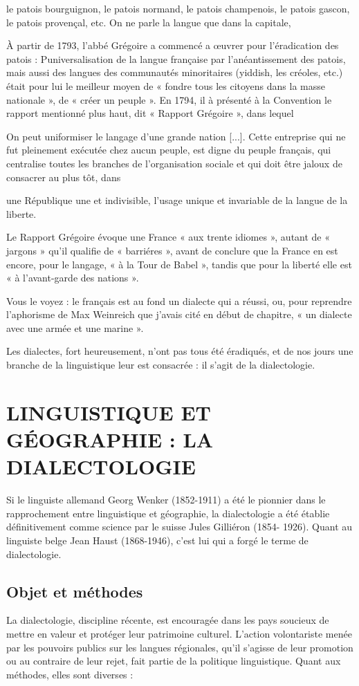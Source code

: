 le patois bourguignon, le patois normand, le patois champenois, le patois gascon, le patois provençal, etc. On ne parle la langue que dans la capitale,


À partir de 1793, l’abbé Grégoire a commencé a œuvrer pour l’éradication des patois : Puniversalisation de la langue française par l’anéantissement des patois, mais aussi des langues des communautés minoritaires (yiddish, les créoles, etc.) était pour lui le meilleur moyen de « fondre tous les citoyens dans la masse nationale », de « créer un peuple ». En 1794, il à présenté à la Convention le rapport mentionné plus haut, dit « Rapport Grégoire », dans lequel



On peut uniformiser le langage d'une grande nation [...]. Cette entreprise qui ne fut pleinement exécutée chez aucun peuple, est digne du peuple français, qui centralise toutes les branches de l’organisation sociale et qui doit être jaloux de consacrer au plus tôt, dans


une République une et indivisible, l’usage unique et invariable de la langue de la liberte.


Le Rapport Grégoire évoque une France « aux trente idiomes », autant de « jargons » qu’il qualifie de « barriéres », avant de conclure que la France en est encore, pour le langage, « à la Tour de Babel », tandis que pour la liberté elle est « à l’avant-garde des nations ».


Vous le voyez : le français est au fond un dialecte qui a réussi, ou, pour reprendre l’aphorisme de Max Weinreich que j’avais cité en début de chapitre, « un dialecte avec une armée et une marine ».


Les dialectes, fort heureusement, n’ont pas tous été éradiqués, et de nos jours une branche de la linguistique leur est consacrée : il s’agit de la dialectologie.


\section{LINGUISTIQUE ET GÉOGRAPHIE : LA DIALECTOLOGIE}

Si le linguiste allemand Georg Wenker (1852-1911) a été le pionnier dans le rapprochement entre linguistique et géographie, la dialectologie a été établie définitivement comme science par le suisse Jules Gilliéron (1854- 1926). Quant au linguiste belge Jean Haust (1868-1946), c’est lui qui a forgé le terme de dialectologie.


\subsection{Objet et méthodes} La dialectologie, discipline récente, est encouragée dans les pays soucieux de mettre en valeur et protéger leur patrimoine culturel. L’action volontariste menée par les pouvoirs publics sur les langues régionales, qu’il s’agisse de leur promotion ou au contraire de leur rejet, fait partie de la politique linguistique. Quant aux méthodes, elles sont diverses :


